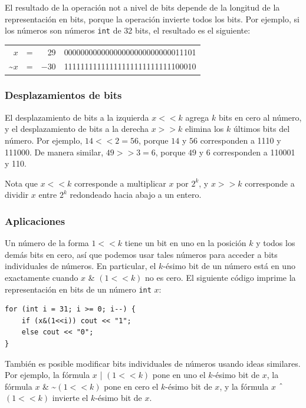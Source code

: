 El resultado de la operación not a nivel de bits
depende de la longitud de la representación en bits,
porque la operación invierte todos los bits.
Por ejemplo, si los números son números \texttt{int}
de 32 bits, el resultado es el siguiente:

\begin{center}
\begin{tabular}{rrrr}
$x$ & = & 29 &   00000000000000000000000000011101 \\
\textasciitilde$x$ & = & $-30$ & 11111111111111111111111111100010 \\
\end{tabular}
\end{center}

\subsubsection{Desplazamientos de bits}


El desplazamiento de bits a la izquierda $x < < k$ agrega $k$
bits en cero al número,
y el desplazamiento de bits a la derecha $x > > k$
elimina los $k$ últimos bits del número.
Por ejemplo, $14 < < 2 = 56$,
porque $14$ y $56$ corresponden a 1110 y 111000.
De manera similar, $49 > > 3 = 6$,
porque $49$ y $6$ corresponden a 110001 y 110.

Nota que $x < < k$
corresponde a multiplicar $x$ por $2^k$,
y $x > > k$
corresponde a dividir $x$ entre $2^k$
redondeado hacia abajo a un entero.

\subsubsection{Aplicaciones}

Un número de la forma $1 < < k$ tiene un bit en uno
en la posición $k$ y todos los demás bits en cero,
así que podemos usar tales números para acceder a bits individuales de números.
En particular, el $k$-ésimo bit de un número está en uno
exactamente cuando $x$ \& $(1 < < k)$ no es cero.
El siguiente código imprime la representación en bits
de un número \texttt{int} $x$:

\begin{lstlisting}
for (int i = 31; i >= 0; i--) {
    if (x&(1<<i)) cout << "1";
    else cout << "0";
}
\end{lstlisting}

También es posible modificar bits individuales
de números usando ideas similares.
Por ejemplo, la fórmula $x$ | $(1 < < k)$
pone en uno el $k$-ésimo bit de $x$,
la fórmula
$x$ \& \textasciitilde $(1 < < k)$
pone en cero el $k$-ésimo bit de $x$,
y la fórmula
$x$ $\XOR$ $(1 < < k)$
invierte el $k$-ésimo bit de $x$.

